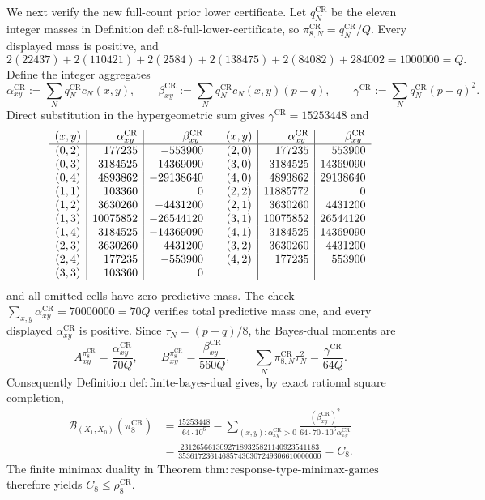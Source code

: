 We next verify the new full-count prior lower certificate.  Let \(q_N^{\mathrm{CR}}\) be the eleven integer masses in Definition \(\mathrm{def{:}n8\mbox{-}full\mbox{-}lower\mbox{-}certificate}\), so \(\pi_{8,N}^{\mathrm{CR}}=q_N^{\mathrm{CR}}/Q\).  Every displayed mass is positive, and
\[
 2(22437)+2(110421)+2(2584)+2(138475)+2(84082)+284002
 =1000000=Q.
\]
Define the integer aggregates
\[
 \alpha_{xy}^{\mathrm{CR}}:=\sum_Nq_N^{\mathrm{CR}}c_N(x,y),\qquad
 \beta_{xy}^{\mathrm{CR}}:=\sum_Nq_N^{\mathrm{CR}}c_N(x,y)(p-q),\qquad
 \gamma^{\mathrm{CR}}:=\sum_Nq_N^{\mathrm{CR}}(p-q)^2.
\]
Direct substitution in the hypergeometric sum gives \(\gamma^{\mathrm{CR}}=15253448\) and
\[
\begin{array}{c|r|r@{\qquad}c|r|r}
(x,y)&\alpha_{xy}^{\mathrm{CR}}&\beta_{xy}^{\mathrm{CR}}&(x,y)&\alpha_{xy}^{\mathrm{CR}}&\beta_{xy}^{\mathrm{CR}}\\ \hline
(0,2)&177235&-553900&(2,0)&177235&553900\\
(0,3)&3184525&-14369090&(3,0)&3184525&14369090\\
(0,4)&4893862&-29138640&(4,0)&4893862&29138640\\
(1,1)&103360&0&(2,2)&11885772&0\\
(1,2)&3630260&-4431200&(2,1)&3630260&4431200\\
(1,3)&10075852&-26544120&(3,1)&10075852&26544120\\
(1,4)&3184525&-14369090&(4,1)&3184525&14369090\\
(2,3)&3630260&-4431200&(3,2)&3630260&4431200\\
(2,4)&177235&-553900&(4,2)&177235&553900\\
(3,3)&103360&0&&&
\end{array}
\]
and all omitted cells have zero predictive mass.  The check
\(
 \sum_{x,y}\alpha_{xy}^{\mathrm{CR}}=70000000=70Q
\)
verifies total predictive mass one, and every displayed \(\alpha_{xy}^{\mathrm{CR}}\) is positive.  Since \(\tau_N=(p-q)/8\), the Bayes-dual moments are
\[
 A_{xy}^{\pi_8^{\mathrm{CR}}}=\frac{\alpha_{xy}^{\mathrm{CR}}}{70Q},\qquad
 B_{xy}^{\pi_8^{\mathrm{CR}}}=\frac{\beta_{xy}^{\mathrm{CR}}}{560Q},\qquad
 \sum_N\pi_{8,N}^{\mathrm{CR}}\tau_N^2=\frac{\gamma^{\mathrm{CR}}}{64Q}.
\]
Consequently Definition \(\mathrm{def{:}finite\mbox{-}bayes\mbox{-}dual}\) gives, by exact rational square completion,
\[
\begin{aligned}
 \mathcal B_{(X_1,X_0)}(\pi_8^{\mathrm{CR}})
 &=\frac{15253448}{64\cdot10^6}
 -\sum_{(x,y):\alpha_{xy}^{\mathrm{CR}}>0}
 \frac{(\beta_{xy}^{\mathrm{CR}})^2}
 {64\cdot70\cdot10^6\alpha_{xy}^{\mathrm{CR}}}\\
 &=\frac{23126566130927189325821140923541183}
 {353617236146857430307249306610000000}=C_8.
\end{aligned}
\]
The finite minimax duality in Theorem \(\mathrm{thm{:}response\mbox{-}type\mbox{-}minimax\mbox{-}games}\) therefore yields \(C_8\leq\rho_8^{\mathrm{CR}}\).

